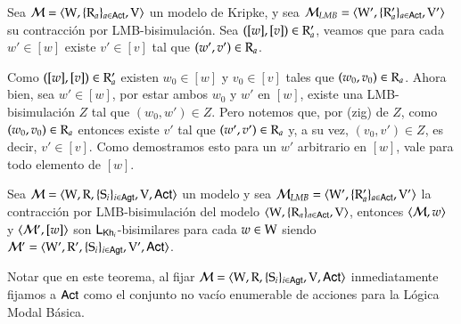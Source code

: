 \begin{demostracion}
    Sea $\mathcal{M} = \langle \mathrm{W},\{\mathrm{R}_a\}_{a\in{\rm \sf Act}},\mathrm{V} \rangle$ un modelo de Kripke, y sea $\mathcal{M}_{LMB} = \langle \mathrm{W}',\{\mathrm{R}_a'\}_{a\in{\rm \sf Act}},\mathrm{V}' \rangle$ su contracción por LMB-bisimulación. Sea $([w],[v]) \in \mathrm{R}'_a$, veamos que para cada $w' \in [w]$ existe $v' \in [v]$ tal que $(w',v') \in \mathrm{R}_a$.

    Como $([w],[v]) \in \mathrm{R}'_a$ existen $w_0 \in [w]$ y $v_0 \in [v]$ tales que $(w_0,v_0)\in \mathrm{R}_a$. Ahora bien, 
    sea $w' \in [w]$, por estar ambos $w_0$ y $w'$ en $[w]$, existe una LMB-bisimulación $Z$ tal que $(w_0,w') \in Z$. 
    Pero notemos que, por (zig) de $Z$, como $(w_0,v_0) \in \mathrm{R}_a$  entonces existe $v'$ tal que $(w',v') \in \mathrm{R}_a$ y, a su vez, 
    $(v_0,v') \in Z$, es decir, $v' \in [v]$. Como demostramos esto para un $w'$ arbitrario en $[w]$, vale para todo elemento de $[w]$.
\end{demostracion}


\begin{teorema}
    Sea $\mathcal{M}=\langle \mathrm{W},\mathrm{R},\{ \mathrm{S}_i \}_{i \in {\rm \sf Agt}},\mathrm{V},{\rm \sf Act} \rangle$ un modelo y sea $\mathcal{M}_{LMB} = \langle \mathrm{W}',\{\mathrm{R}_a'\}_{a\in{\rm \sf Act}},\mathrm{V}' \rangle$ 
    la contracción por LMB-bisimulación del modelo $\langle \mathrm{W},\{\mathrm{R}_a\}_{a\in{\rm \sf Act}},\mathrm{V} \rangle$, entonces $\langle \mathcal{M},w \rangle$ y $\langle \mathcal{M}',[w] \rangle$ 
    son $\mathsf{L}_{\mathsf{Kh}_i}$-bisimilares para cada $w \in \mathrm{W}$ siendo $\mathcal{M}' = \langle \mathrm{W}',\mathrm{R}',\{ \mathrm{S}_i \}_{i \in {\rm \sf Agt}},\mathrm{V}',{\rm \sf Act} \rangle$.
\end{teorema}

Notar que en este teorema, al fijar $\mathcal{M}=\langle \mathrm{W},\mathrm{R},\{ \mathrm{S}_i \}_{i \in {\rm \sf Agt}},\mathrm{V},{\rm \sf Act} \rangle$ inmediatamente fijamos a ${\rm \sf Act}$ como el conjunto no vacío enumerable de acciones para la Lógica Modal Básica.

